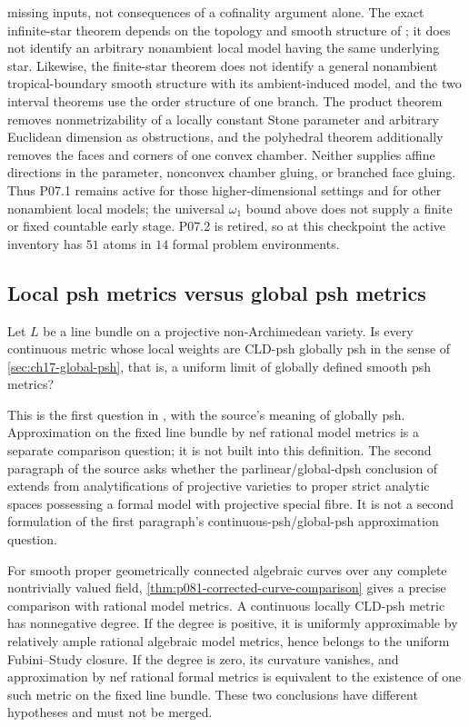 missing inputs, not consequences of a cofinality argument alone.
The exact infinite-star theorem depends on the topology and smooth structure
of \cite[\S6.7.3]{CLD25}; it does not identify an arbitrary nonambient local
model having the same underlying star.  Likewise, the finite-star theorem
does not identify a general nonambient tropical-boundary smooth structure
with its ambient-induced model, and the two interval theorems use the order
structure of one branch.  The product theorem removes nonmetrizability of a
locally constant Stone parameter and arbitrary Euclidean dimension as
obstructions, and the polyhedral theorem additionally removes the faces and
corners of one convex chamber.  Neither supplies affine directions in the
parameter, nonconvex chamber gluing, or branched face gluing.  Thus P07.1
remains active for those higher-dimensional settings and for other
nonambient local models;
the universal $\omega_1$ bound above does not supply a finite or fixed
countable early stage.  P07.2 is retired, so at this checkpoint the active
inventory has $51$ atoms in $14$ formal problem environments.

\subsection{Local psh metrics versus global psh metrics}

\begin{problem}\label{prob:frontier-cld-global-metric}
Let \(L\) be a line bundle on a projective non-Archimedean variety.
Is every continuous metric whose local weights are CLD-psh globally psh
in the sense of \cref{sec:ch17-global-psh}, that is, a uniform limit of
globally defined smooth psh metrics?
\end{problem}

This is the first question in \cite[Remark~17.8.10]{CLD25}, with
the source's meaning of globally psh.  Approximation on the fixed line
bundle by nef rational model metrics is a separate comparison question;
it is not built into this definition.  The second paragraph of the source
asks whether the parlinear/global-dpsh conclusion of
\cite[Corollary~17.8.9]{CLD25} extends from analytifications of projective
varieties to proper strict analytic spaces possessing a formal model with
projective special fibre.  It is not a second formulation of the first
paragraph's continuous-psh/global-psh approximation question.

For smooth proper geometrically connected algebraic curves over any
complete nontrivially valued field,
\cref{thm:p081-corrected-curve-comparison} gives a precise comparison with
rational model metrics.  A continuous locally CLD-psh metric has
nonnegative degree.  If the degree is positive, it is uniformly
approximable by relatively ample rational algebraic model metrics, hence
belongs to the uniform Fubini--Study closure.  If the degree is zero, its
curvature vanishes, and approximation by nef rational formal metrics is
equivalent to the existence of one such metric on the fixed line bundle.
These two conclusions have different hypotheses and must not be merged.

